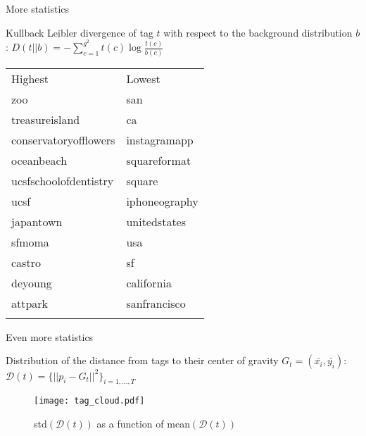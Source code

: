 \begin{frame}{More statistics}

Kullback Leibler divergence of tag $t$ with respect to the background
distribution $b$:
$D(t||b) = -\sum_{c=1}^{g^2} t(c)\log \frac{t(c)}{b(c)}$

\begin{small}
\begin{longtable}[c]{@{}ll@{}}
\hline\noalign{\medskip}
Highest & Lowest
\\\noalign{\medskip}
\hline\noalign{\medskip}
zoo & san
\\\noalign{\medskip}
treasureisland & ca
\\\noalign{\medskip}
conservatoryofflowers & instagramapp
\\\noalign{\medskip}
oceanbeach & squareformat
\\\noalign{\medskip}
ucsfschoolofdentistry & square
\\\noalign{\medskip}
ucsf & iphoneography
\\\noalign{\medskip}
japantown & unitedstates
\\\noalign{\medskip}
sfmoma & usa
\\\noalign{\medskip}
castro & sf
\\\noalign{\medskip}
deyoung & california
\\\noalign{\medskip}
attpark & sanfrancisco
\\\noalign{\medskip}
\hline
\end{longtable}
\end{small}

\end{frame}

\begin{frame}{Even more statistics}

Distribution of the distance from tags to their center of gravity
$G_t =   (\bar{x_i}, \bar{y_i})$:
$\mathcal{D}(t) = \{||p_i - G_t||^2\}_{i=1, \dots, T}$

\begin{figure} \texttt{[image: tag\_cloud.pdf]}
\caption{std$(\mathcal{D}(t))$ as a function of mean$(\mathcal{D}(t))$}
\end{figure}

\end{frame}

